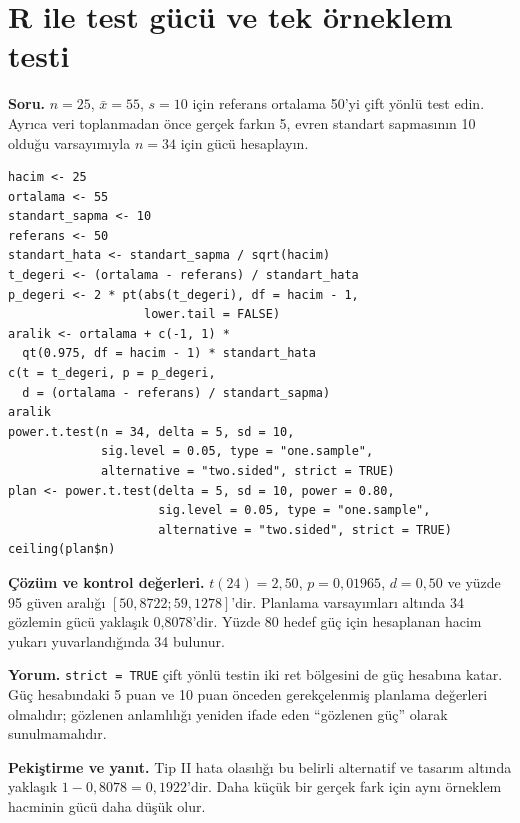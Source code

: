 \section{R ile test gücü ve tek örneklem testi}
\label{sec:r-b10}

\textbf{Soru.} $n=25$, $\bar x=55$, $s=10$ için referans ortalama 50'yi
çift yönlü test edin. Ayrıca veri toplanmadan önce gerçek farkın 5, evren
standart sapmasının 10 olduğu varsayımıyla $n=34$ için gücü hesaplayın.

\begin{lstlisting}[style=prismR]
hacim <- 25
ortalama <- 55
standart_sapma <- 10
referans <- 50
standart_hata <- standart_sapma / sqrt(hacim)
t_degeri <- (ortalama - referans) / standart_hata
p_degeri <- 2 * pt(abs(t_degeri), df = hacim - 1,
                   lower.tail = FALSE)
aralik <- ortalama + c(-1, 1) *
  qt(0.975, df = hacim - 1) * standart_hata
c(t = t_degeri, p = p_degeri,
  d = (ortalama - referans) / standart_sapma)
aralik
power.t.test(n = 34, delta = 5, sd = 10,
             sig.level = 0.05, type = "one.sample",
             alternative = "two.sided", strict = TRUE)
plan <- power.t.test(delta = 5, sd = 10, power = 0.80,
                     sig.level = 0.05, type = "one.sample",
                     alternative = "two.sided", strict = TRUE)
ceiling(plan$n)
\end{lstlisting}

\begin{outputguidebox}
\textbf{Çözüm ve kontrol değerleri.} $t(24)=2{,}50$, $p=0{,}01965$,
$d=0{,}50$ ve yüzde 95 güven aralığı $[50{,}8722;59{,}1278]$'dir.
Planlama varsayımları altında 34 gözlemin gücü yaklaşık 0,8078'dir.
Yüzde 80 hedef güç için hesaplanan hacim yukarı yuvarlandığında 34 bulunur.
\end{outputguidebox}

\textbf{Yorum.} \texttt{strict = TRUE} çift yönlü testin iki ret bölgesini
de güç hesabına katar. Güç hesabındaki 5 puan ve 10 puan önceden gerekçelenmiş
planlama değerleri olmalıdır; gözlenen anlamlılığı yeniden ifade eden
``gözlenen güç'' olarak sunulmamalıdır.

\textbf{Pekiştirme ve yanıt.} Tip II hata olasılığı bu belirli alternatif
ve tasarım altında yaklaşık $1-0{,}8078=0{,}1922$'dir. Daha küçük bir gerçek
fark için aynı örneklem hacminin gücü daha düşük olur.